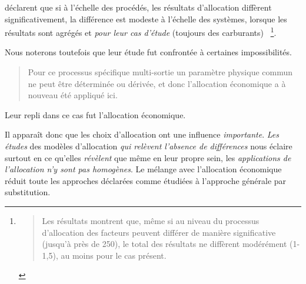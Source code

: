 
\citeauthor{guinee_calculating_2007} déclarent que si à l'échelle des procédés, les résultats d'allocation diffèrent significativement, la différence est modeste à l'échelle des systèmes, lorsque les résultats sont agrégés et \emph{pour leur cas d'étude} (toujours des carburants)~\cite{guinee_calculating_2007}
\footnote{
\blockcquote[traduction]{guinee_calculating_2007}{
Les résultats montrent que, même si au niveau du processus d'allocation des facteurs peuvent différer de manière significative (jusqu'à près de 250), le total des résultats ne diffèrent modérément (1-1,5), au moins pour le cas présent.
}
}.

Nous noterons toutefois que leur étude fut confrontée à certaines impossibilités.
\blockcquote[traduction]{guinee_calculating_2007}{
Pour ce processus spécifique multi-sortie un paramètre physique commun ne peut être déterminée ou dérivée, et donc l'allocation économique a à nouveau été appliqué ici.
}
Leur repli dans ce cas fut l'allocation économique.

Il apparaît donc que les choix d'allocation ont une influence \emph{importante}.
\emph{Les études} des modèles d'allocation \emph{qui relèvent l'absence de différences} nous éclaire surtout en ce qu'elles \emph{révèlent} que même en leur propre sein, les \emph{applications de l'allocation n'y sont pas homogènes}.
Le mélange avec l'allocation économique réduit toute les approches déclarées comme étudiées à l'approche générale par substitution.

